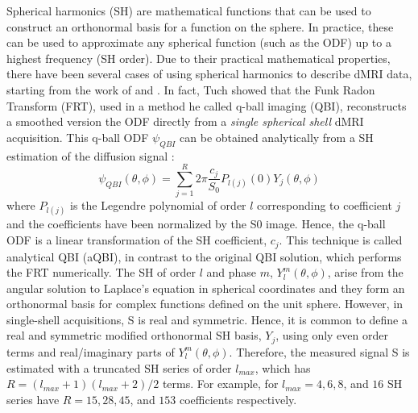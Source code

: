 \documentclass{bioinfo}
\begin{document}
Spherical harmonics (SH) are mathematical functions that can be used to construct an orthonormal basis for a function on the sphere. In practice, these can be used to approximate any spherical function (such as the ODF) up to a highest frequency (SH order). Due to their practical mathematical properties, there have been several cases of using spherical harmonics to describe dMRI data, starting from the work of \citet{Frank2001, Frank2002} and \citet{tuch-reese-etal:02}. In fact, Tuch showed that the Funk Radon Transform (FRT), used in a method he called q-ball imaging (QBI), reconstructs a smoothed version the ODF directly from a \emph{single spherical shell} dMRI acquisition. This q-ball ODF $\psi_{QBI}$ can be obtained analytically from a SH estimation of the diffusion signal \citep{descoteaux-angelino-etal:07, hess-mukherjee-etal:06, anderson:05}:
\begin{equation}\label{eq.qball}
\psi_{QBI}(\theta, \phi) = \sum_{j=1}^{R} 2\pi \frac{c_j}{S_0} P_{l(j)} (0) Y_{j} (\theta, \phi)
\end{equation}
where $P_{l(j)}$ is the Legendre polynomial of order $l$ corresponding to coefficient $j$ and the coefficients have been normalized by the S0 image. Hence, the q-ball ODF is a linear transformation of the SH coefficient, $c_j$. This technique is called analytical QBI (aQBI), in contrast to the original QBI solution, which performs the FRT numerically.
The SH of order $l$ and phase $m$, $Y_{l}^{m}(\theta, \phi)$, arise from the angular solution to Laplace's equation in spherical coordinates and they form an orthonormal basis for
complex functions defined on the unit sphere. However, in single-shell acquisitions, S is real and symmetric. Hence, it is common to define a real and symmetric modified orthonormal SH basis, $Y_{j}$, using only even order terms and real/imaginary parts of $Y_{l}^{m}(\theta, \phi)$. Therefore, the measured signal S is estimated with a truncated SH series of order $l_{max}$, which has $R = (l_{max} +1)( l_{max} +2)/2$ terms. For example, for $l_{max} = 4, 6, 8$, and $16$ SH series have $R = 15, 28, 45$, and $153$ coefficients respectively.
\end{document}
